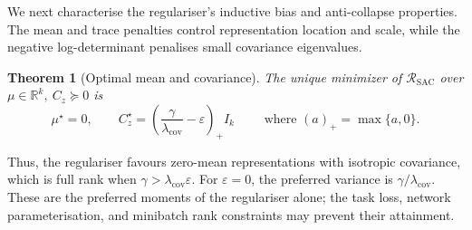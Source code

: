 \documentclass{article} %
\newtheorem{theorem}{Theorem}[section]
\theoremstyle{remark}
\begin{document}
We next characterise the regulariser's inductive bias and anti-collapse properties. The mean and trace penalties control representation location and scale, while the negative log-determinant penalises small covariance eigenvalues.



\begin{theorem}[Optimal mean and covariance]
\label{thm:nonlinear-optimal-covariance}
The unique minimizer of \(\mathcal{R}_{\mathrm{SAC}}\) over $\mu\in\mathbb R^k,\ C_z\succeq0$ is
\begin{equation}
\boxed{
\mu^\star=0,
\qquad
C_z^\star
=
\left(
    \frac{\gamma}{\lambda_{\mathrm{cov}}}
    -
    \varepsilon
\right)_{+}I_k
}\qquad  \text{ where } (a)_{+}=\max\{a,0\}. 
\label{eq:nonlinear-optimal-covariance}
\end{equation}

\end{theorem}

 Thus, the regulariser favours zero-mean representations with isotropic covariance, which is full rank when $\gamma>\lambda_{\mathrm{cov}}\varepsilon$. For $\varepsilon=0$, the preferred variance is $\gamma/\lambda_{\mathrm{cov}}$. These are the preferred moments of the regulariser alone; the task loss, network parameterisation, and minibatch rank constraints may prevent their attainment. 
\end{document}
